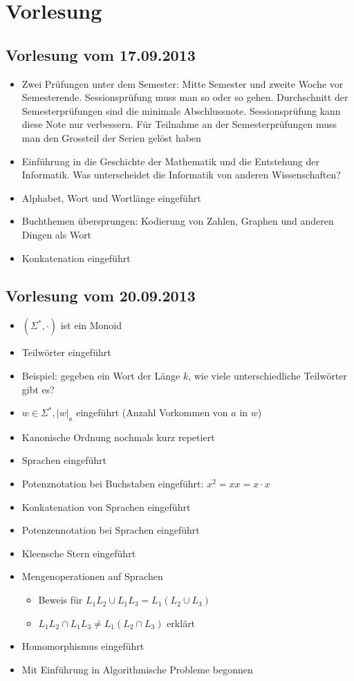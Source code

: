 \chapter{Vorlesung}
\section{Vorlesung vom 17.09.2013}
\begin{itemize}
  \item Zwei Prüfungen unter dem Semester: Mitte Semester und zweite Woche vor Semesterende. Sessionsprüfung muss man so oder so gehen. Durchschnitt der Semesterprüfungen sind die minimale Abschlussnote. Sessionsprüfung kann diese Note nur verbessern. Für Teilnahme an der Semesterprüfungen muss man den Grossteil der Serien gelöst haben
  \item Einführung in die Geschichte der Mathematik und die Entstehung der Informatik. Was unterscheidet die Informatik von anderen Wissenschaften?
  \item Alphabet, Wort und Wortlänge eingeführt
  \item Buchthemen übersprungen: Kodierung von Zahlen, Graphen und anderen Dingen als Wort
  \item Konkatenation eingeführt
\end{itemize}

\section{Vorlesung vom 20.09.2013}
\begin{itemize}
  \item $(\Sigma^*, \cdot)$ ist ein Monoid
  \item Teilwörter eingeführt
  \item Beispiel: gegeben ein Wort der Länge $k$, wie viele unterschiedliche Teilwörter gibt es?
  \item $w \in \Sigma^*, |w|_a$ eingeführt (Anzahl Vorkommen von $a$ in $w$)
  \item Kanonische Ordnung nochmals kurz repetiert
  \item Sprachen eingeführt
  \item Potenznotation bei Buchstaben eingeführt: $x^2 = xx = x \cdot x$
  \item Konkatenation von Sprachen eingeführt
  \item Potenzennotation bei Sprachen eingeführt
  \item Kleensche Stern eingeführt
  \item Mengenoperationen auf Sprachen
  \begin{itemize}
    \item Beweis für $L_1 L_2 \cup L_1 L_3 = L_1 (L_2 \cup L_3)$
    \item $L_1 L_2 \cap L_1 L_3 \not= L_1 (L_2 \cap L_3)$ erklärt
  \end{itemize}
  \item Homomorphismus eingeführt
  \item Mit Einführung in Algorithmische Probleme begonnen
\end{itemize}
